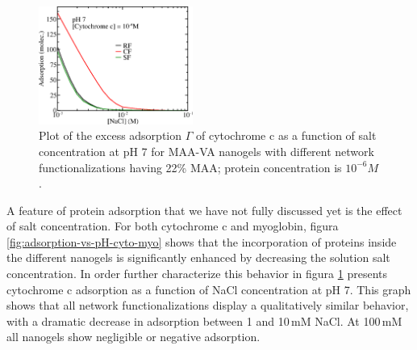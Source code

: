
\begin{figure}
     \centering
     \includegraphics[width=0.45\textwidth]{Figures/graphs-gel2/gamma-salts-cyto.png}
     \caption{Plot of the excess adsorption $\Gamma$ of cytochrome c as a function of salt concentration at pH 7 for MAA-VA nanogels with different network functionalizations having 22\% MAA; protein concentration is $10^{-6}M$.}
     \label{fig:Adsorption-vs-Salt-cyto}
 \end{figure}
 

A feature of protein adsorption that we have not fully discussed yet is the effect of salt concentration.
For both cytochrome c and myoglobin, figura \ref{fig:adsorption-vs-pH-cyto-myo} shows that the incorporation of proteins inside the different nanogels is significantly enhanced by decreasing the solution salt concentration.
In order further characterize this behavior in  figura \ref{fig:Adsorption-vs-Salt-cyto} presents cytochrome c adsorption as a function of NaCl concentration at pH 7. 
This graph shows that all network functionalizations display a qualitatively similar behavior, with a dramatic decrease in adsorption between 1 and 10\,mM NaCl.
At 100\,mM all nanogels show negligible or negative adsorption.


